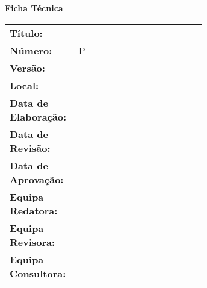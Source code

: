 \vfill
\begin{flushleft}
	\textbf{\textcolor{colorschema}{Ficha Técnica}} \\
	\vspace{12pt}
	
	{
		\renewcommand{\arraystretch}{1.4}
		\begin{tabular}{l!{\color{colorschema}\vrule width 0.5mm}p{0.65\linewidth}}
		    \textbf{Título:}             & \titulo\\
		    \textbf{Número:}             & P\numero\\
		    \textbf{Versão:}             & {\versao} \\
		    \textbf{Local:}              & \local \\
		    \textbf{Data de Elaboração:} & \dataElaboracao \\
		    \textbf{Data de Revisão:}    & \dataRevisao \\
		    \textbf{Data de Aprovação:}  & \dataAprovacao \\
		    \textbf{Equipa Redatora:}    & \equipaRedatora \\
		    \textbf{Equipa Revisora:}    & \equipaRevisora \\
		    \textbf{Equipa Consultora:}  & \equipaConsultora \\
		\end{tabular}
	}
\end{flushleft}